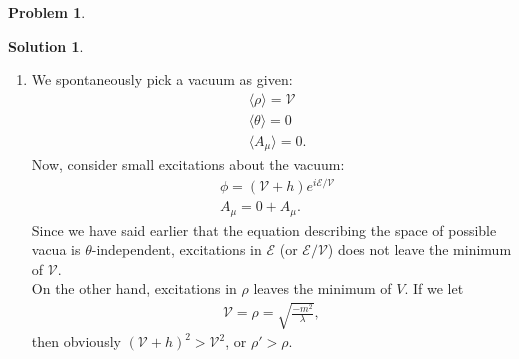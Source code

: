 \documentclass[a4paper,11pt]{article}
\numberwithin{equation}{section}
\theoremstyle{definition}
\newtheorem{prob}{Problem}[section]
\newtheorem{sln}{Solution}[section]
\newcommand{\E}{\mathcal{E}}
\newcommand{\V}{\mathcal{V}}
\begin{document}
\begin{prob}
\begin{sln}
\begin{enumerate}
				
				
				
				
				
				
				
				
				
				
				
				\item We spontaneously pick a vacuum as given:
				\begin{align}
				&\langle \rho \rangle = \V\\
				&\langle \theta \rangle  = 0\\
				&\langle A_\mu \rangle = 0.
				\end{align}
				Now, consider small excitations about the vacuum:
				\begin{align}
				&\phi = (\V+h)e^{i\E/\V}\\
				&A_\mu = 0 + A_\mu.
				\end{align}
				Since we have said earlier that the equation describing the space of possible vacua is $\theta$-independent, excitations in $\E$ (or $\E/\V$) does not leave the minimum of $\V$.\\
				
				On the other hand, excitations in $\rho$ leaves the minimum of $V$. If we let
				\begin{align}
				\V = \rho = \sqrt{\frac{-m^2}{\lambda}},
				\end{align}
				then obviously $(\V+h)^2 > \V^2$, or $\rho' > \rho$.\\
				
				
				
				
				
				
				
				
				
				
				
				
				
				
				

\end{enumerate}
\end{sln}
\end{prob}
\end{document}
